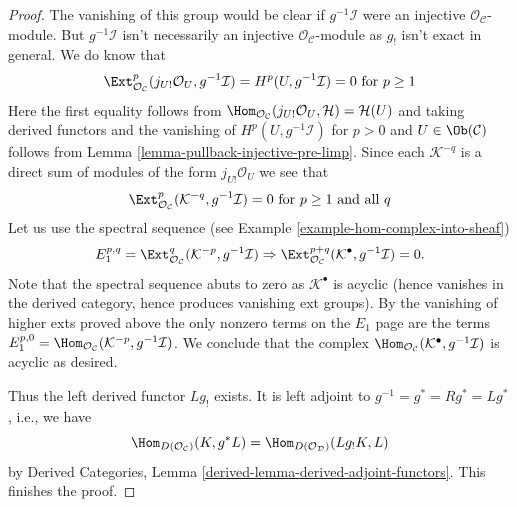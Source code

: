 \begin{proof}
\medskip\noindent
The vanishing of this group would be clear if $g^{-1}\mathcal{I}$
were an injective $\mathcal{O}_\mathcal{C}$-module. But
$g^{-1}\mathcal{I}$ isn't necessarily an injective
$\mathcal{O}_\mathcal{C}$-module as $g_!$ isn't exact in
general. We do know that
$$
\Ext^p_{\mathcal{O}_\mathcal{C}}(
j_{U!}\mathcal{O}_U, g^{-1}\mathcal{I}) =
H^p(U, g^{-1}\mathcal{I}) = 0 \text{ for }p \geq 1
$$
Here the first equality follows from
$\Hom_{\mathcal{O}_\mathcal{C}}(j_{U!}\mathcal{O}_U, \mathcal{H}) =
\mathcal{H}(U)$ and taking derived functors and the vanishing of
$H^p(U, g^{-1}\mathcal{I})$ for $p > 0$ and $U \in \Ob(\mathcal{C})$
follows from Lemma \ref{lemma-pullback-injective-pre-limp}.
Since each $\mathcal{K}^{-q}$ is a direct sum of modules of the form
$j_{U!}\mathcal{O}_U$ we see that
$$
\Ext^p_{\mathcal{O}_\mathcal{C}}(\mathcal{K}^{-q}, g^{-1}\mathcal{I}) = 0
\text{ for }p \geq 1\text{ and all }q
$$
Let us use the spectral sequence (see
Example
\ref{example-hom-complex-into-sheaf})
$$
E_1^{p, q} = \Ext^q_{\mathcal{O}_\mathcal{C}}(
\mathcal{K}^{-p}, g^{-1}\mathcal{I})
\Rightarrow
\Ext^{p + q}_{\mathcal{O}_\mathcal{C}}(
\mathcal{K}^\bullet, g^{-1}\mathcal{I}) = 0.
$$
Note that the spectral sequence abuts to zero as $\mathcal{K}^\bullet$
is acyclic (hence vanishes in the derived category, hence produces
vanishing ext groups). By the vanishing of higher exts proved above
the only nonzero terms on the $E_1$ page are the terms
$E_1^{p, 0} = \Hom_{\mathcal{O}_\mathcal{C}}(
\mathcal{K}^{-p}, g^{-1}\mathcal{I})$.
We conclude that the complex
$\Hom_{\mathcal{O}_\mathcal{C}}(
\mathcal{K}^\bullet, g^{-1}\mathcal{I})$
is acyclic as desired.

\medskip\noindent
Thus the left derived functor $Lg_!$ exists.
It is left adjoint to $g^{-1} = g^* = Rg^* = Lg^*$, i.e., we have
\begin{equation}
\label{equation-to-prove}
\Hom_{D(\mathcal{O}_\mathcal{C})}(K, g^*L) =
\Hom_{D(\mathcal{O}_\mathcal{D})}(Lg_!K, L)
\end{equation}
by Derived Categories, Lemma \ref{derived-lemma-derived-adjoint-functors}.
This finishes the proof.
\end{proof}

